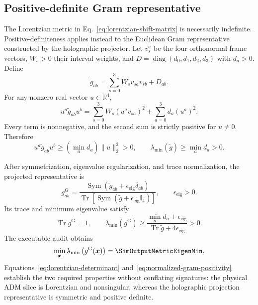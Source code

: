 \subsection{Positive-definite Gram representative}

The Lorentzian metric in Eq.~\eqref{eq:lorentzian-shift-matrix} is necessarily indefinite.  Positive-definiteness applies instead to the Euclidean Gram representative constructed by the holographic projector.  Let \(v_s^a\) be the four orthonormal frame vectors, \(W_s>0\) their interval weights, and \(D=\operatorname{diag}(d_0,d_1,d_2,d_3)\) with \(d_a>0\).  Define
\begin{equation}
  \widetilde g_{ab}
  =
  \sum_{s=0}^{3}
  W_s
  v_{sa}v_{sb}
  +
  D_{ab}.
  \label{eq:weighted-gram-representative}
\end{equation}
For any nonzero real vector \(u\in\mathbb R^4\),
\begin{equation}
  u^a\widetilde g_{ab}u^b
  =
  \sum_{s=0}^{3}
  W_s
  \left(
    u^a v_{sa}
  \right)^2
  +
  \sum_{a=0}^{3}
  d_a
  (u^a)^2.
  \label{eq:gram-quadratic-form}
\end{equation}
Every term is nonnegative, and the second sum is strictly positive for \(u\neq0\).  Therefore
\begin{equation}
  u^a\widetilde g_{ab}u^b
  \geq
  \left(
    \min_a d_a
  \right)
  \|u\|_2^2
  >0,
  \qquad
  \lambda_{\min}(\widetilde g)
  \geq
  \min_a d_a
  >0.
  \label{eq:gram-positive-definite-proof}
\end{equation}

After symmetrization, eigenvalue regularization, and trace normalization, the projected representative is
\begin{equation}
  g_{ab}^{\mathrm G}
  =
  \frac{
    \operatorname{Sym}
    \left(
      \widetilde g_{ab}
      +
      \epsilon_{\mathrm{eig}}\delta_{ab}
    \right)
  }{
    \operatorname{Tr}
    \left[
      \operatorname{Sym}
      \left(
        \widetilde g
        +
        \epsilon_{\mathrm{eig}}\mathbb I_4
      \right)
    \right]
  },
  \qquad
  \epsilon_{\mathrm{eig}}>0.
  \label{eq:trace-normalized-gram-metric}
\end{equation}
Its trace and minimum eigenvalue satisfy
\begin{equation}
  \operatorname{Tr}g^{\mathrm G}
  =
  1,
  \qquad
  \lambda_{\min}(g^{\mathrm G})
  \geq
  \frac{
    \min_a d_a+\epsilon_{\mathrm{eig}}
  }{
    \operatorname{Tr}\widetilde g
    +
    4\epsilon_{\mathrm{eig}}
  }
  >0.
  \label{eq:normalized-gram-positivity}
\end{equation}
The executable audit obtains
\begin{equation}
  \min_{\boldsymbol{x}}
  \lambda_{\min}
  \left(
    g^{\mathrm G}(\boldsymbol{x})
  \right)
  =
  \SimOutputMetricEigenMin.
  \label{eq:numerical-gram-eigenvalue}
\end{equation}
Equations~\eqref{eq:lorentzian-determinant} and~\eqref{eq:normalized-gram-positivity} establish the two required properties without conflating signatures: the physical ADM slice is Lorentzian and nonsingular, whereas the holographic projection representative is symmetric and positive definite.